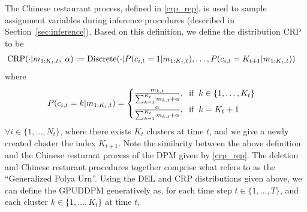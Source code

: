 \documentclass[twocolumn, final]{svjour3}
\begin{document}
The Chinese restaurant process, defined in \eqref{crp_rep}, is used to sample assignment variables during inference procedures (described in Section~\ref{sec:inference}). Based on this definition, we define the distribution CRP to be
\begin{equation}
\label{CRP}
\begin{split}
\text{CRP} & (\cdot | m_{1:K_{t},t}, \hspace{1mm} \alpha) :=
\text{Discrete}(\cdot | P(c_{i,t}=1 | m_{1:K_{t},t}), \ldots, P(c_{i,t}=K_{t+1}  | m_{1:K_{t},t}))
\end{split}
\end{equation}
where
\begin{equation}
P(c_{i,t}=k  | m_{1:K_{t},t}) = 
\begin{cases}
\frac{m_{k,t}}{\sum_{k=1}^{K_{t}} m_{k,t} + \alpha}, \hspace{2mm} \text{if} \hspace{2mm} k \in \{ 1, \ldots, K_{t} \} \\
\frac{\alpha}{\sum_{k=1}^{K_{t}} m_{k,t} + \alpha}, \hspace{2mm} \text{if} \hspace{2mm} k = K_{t} + 1
\end{cases}
\end{equation}
$\forall i \in \{1, \ldots, N_{t} \}$, where there exists $K_{t}$ clusters at time $t$, and we give a newly created cluster the index $K_{t+1}$. Note the similarity between the above definition and the Chinese resturant process of the DPM given by \eqref{crp_rep}. The deletion and Chinese resturant procedures together comprise what \cite{caron_2007} refers to as the ``Generalized Polya Urn''. Using the DEL and CRP distributions given above, we can define the GPUDDPM generatively as, for each time step $t \in \{1, \ldots, T\}$, and each cluster $k \in \{ 1, \ldots, K_{t} \}$ at time $t$,  %
\end{document}
